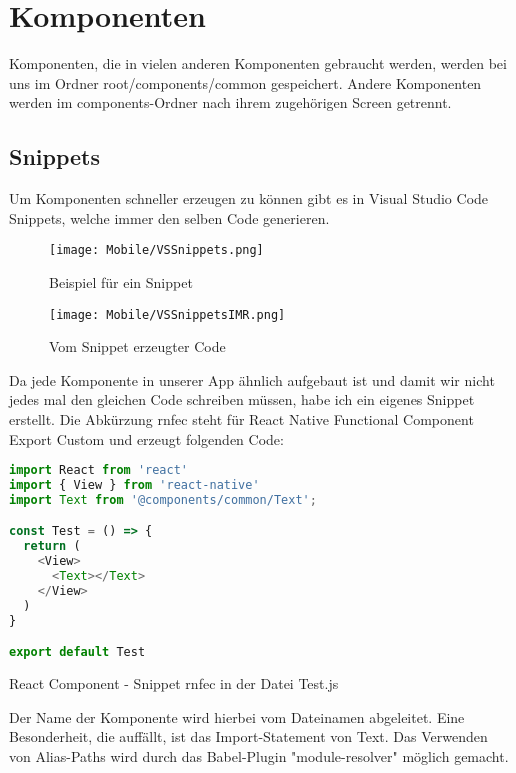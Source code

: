 \section{Komponenten}
Komponenten, die in vielen anderen Komponenten gebraucht werden, werden bei uns im Ordner
root/components/common gespeichert. Andere Komponenten werden im components-Ordner nach ihrem
zugehörigen Screen getrennt.

\subsection{Snippets}
Um Komponenten schneller erzeugen zu können gibt es in Visual Studio Code Snippets, welche immer den
selben Code generieren.

\begin{figure}[H]
  \begin{center}
    \texttt{[image: Mobile/VSSnippets.png]}
    \caption{Beispiel für ein Snippet}
  \end{center}
\end{figure}

\begin{figure}[H]
  \begin{center}
    \texttt{[image: Mobile/VSSnippetsIMR.png]}
    \caption{Vom Snippet erzeugter Code}
  \end{center}
\end{figure}

Da jede Komponente in unserer App ähnlich aufgebaut ist und damit wir nicht jedes mal den gleichen
Code schreiben müssen, habe ich ein eigenes Snippet erstellt. Die Abkürzung rnfec steht für React
Native Functional Component Export Custom und erzeugt folgenden Code:

\begin{code}[htp]
\begin{lstlisting}[firstnumber=1,language=JavaScript, style=JSX]
import React from 'react'
import { View } from 'react-native'
import Text from '@components/common/Text';

const Test = () => {
  return (
    <View>
      <Text></Text>
    </View>
  )
}

export default Test
\end{lstlisting}
\caption{React Component - Snippet rnfec in der Datei Test.js}
\end{code}

Der Name der Komponente wird hierbei vom Dateinamen abgeleitet. Eine Besonderheit, die auffällt, ist
das Import-Statement von Text. Das Verwenden von Alias-Paths wird durch das Babel-Plugin
"module-resolver" möglich gemacht.

